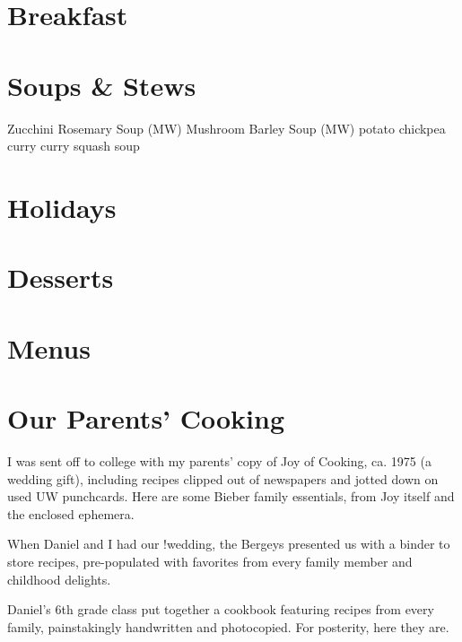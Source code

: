 \documentclass{article}
\begin{document}
\tableofcontents

\section{Breakfast}
% 




\section{Soups \& Stews}

Zucchini Rosemary Soup (MW)
Mushroom Barley Soup (MW)
potato chickpea curry
curry squash soup

\section{Holidays}






\section{Desserts}



\section{Menus}


\section{Our Parents' Cooking}
I was sent off to college with my parents' copy of Joy of Cooking, ca. 1975 (a wedding gift), including recipes clipped out of newspapers and jotted down on used UW punchcards. Here are some Bieber family essentials, from Joy itself and the enclosed ephemera.
% 

When Daniel and I had our !wedding, the Bergeys presented us with a binder to store recipes, pre-populated with favorites from every family member and childhood delights.
% 

Daniel's 6th grade class put together a cookbook featuring recipes from every family, painstakingly handwritten and photocopied. For posterity, here they are.
% 

\printindex
\end{document}
